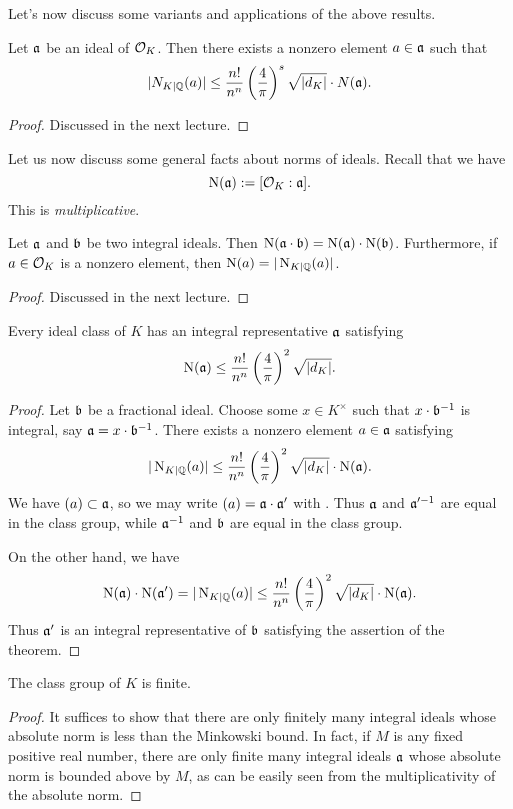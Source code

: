 Let's now discuss some variants and applications of the above results.
\begin{theorem}
  Let $\mathfrak{a}$ be an ideal of $\mathcal{O}_{K}$.
  Then there exists a nonzero element $a \in \mathfrak{a}$ such that
  \[ |N_{K|\mathbb{Q}}(a)| \leq \frac{n!}{n^{n}}\left(\frac{4}{\pi}\right)^{s} \sqrt{|d_{K}|} \cdot N(\mathfrak{a}). \]
\end{theorem}
\begin{proof}
  Discussed in the next lecture.
\end{proof}

Let us now discuss some general facts about norms of ideals.
Recall that we have
\[ \operatorname{N}(\mathfrak{a}) := [\mathcal{O}_{K}:\mathfrak{a}]. \]
This is \emph{multiplicative}.
\begin{lemma}
  Let $\mathfrak{a}$ and $\mathfrak{b}$ be two integral ideals.
  Then $\operatorname{N}(\mathfrak{a}\cdot\mathfrak{b}) = \operatorname{N}(\mathfrak{a}) \cdot \operatorname{N}(\mathfrak{b})$.
  Furthermore, if $a \in \mathcal{O}_{K}$ is a nonzero element, then $\operatorname{N}(a) = |\operatorname{N}_{K|\mathbb{Q}}(a)|$.
\end{lemma}
\begin{proof}
  Discussed in the next lecture.
\end{proof}

\begin{corollary}
  Every ideal class of $K$ has an integral representative $\mathfrak{a}$ satisfying
  \[ \operatorname{N}(\mathfrak{a}) \leq \frac{n!}{n^{n}}\left(\frac{4}{\pi}\right)^{2} \sqrt{|d_{K}|}. \]
\end{corollary}
\begin{proof}
  Let $\mathfrak{b}$ be a fractional ideal.
  Choose some $x \in K^{\times}$ such that $x \cdot \mathfrak{b}^{-1}$ is integral, say $\mathfrak{a} = x \cdot \mathfrak{b}^{-1}$.
  There exists a nonzero element $a \in \mathfrak{a}$ satisfying
  \[ |\operatorname{N}_{K|\mathbb{Q}}(a)| \leq \frac{n!}{n^{n}}\left(\frac{4}{\pi}\right)^{2} \sqrt{|d_{K}|} \cdot \operatorname{N}(\mathfrak{a}). \]
  We have $(a) \subset \mathfrak{a}$, so we may write $(a) = \mathfrak{a} \cdot \mathfrak{a}'$ with .
  Thus $\mathfrak{a}$ and $\mathfrak{a}'^{-1}$ are equal in the class group, while $\mathfrak{a}^{-1}$ and $\mathfrak{b}$ are equal in the class group.

  On the other hand, we have
  \[ \operatorname{N}(\mathfrak{a}) \cdot \operatorname{N}(\mathfrak{a}') = |\operatorname{N}_{K|\mathbb{Q}}(a)| \leq \frac{n!}{n^{n}}\left(\frac{4}{\pi}\right)^{2} \sqrt{|d_{K}|} \cdot \operatorname{N}(\mathfrak{a}). \]
  Thus $\mathfrak{a}'$ is an integral representative of $\mathfrak{b}$ satisfying the assertion of the theorem.
\end{proof}

\begin{corollary}
  The class group of $K$ is finite.
\end{corollary}
\begin{proof}
  It suffices to show that there are only finitely many integral ideals whose absolute norm is less than the Minkowski bound.
  In fact, if $M$ is any fixed positive real number, there are only finite many integral ideals $\mathfrak{a}$ whose absolute norm is bounded above by $M$, as can be easily seen from the multiplicativity of the absolute norm.
\end{proof}

